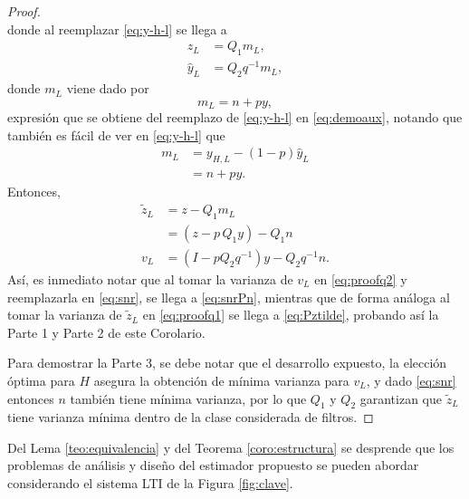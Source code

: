 \begin{proof}{\ \\}
\begin{equation}
\end{equation}
donde al reemplazar \eqref{eq:y-h-l} se llega a
\begin{align}\label{eq:en-funcion-de-m}
\hat{z}_L &= Q_1 m_L,\\
\hat{y}_L &= Q_2q^{-1} m_L,
\end{align}
donde $m_L$ viene dado por
\begin{equation}
m_L = n+py,
\end{equation}
expresi\'on que se obtiene del reemplazo de \eqref{eq:y-h-l} en \eqref{eq:demoaux}, notando que tambi\'en es f\'acil de ver en \eqref{eq:y-h-l} que
\begin{align}\label{eq:y-barra}
\nonumber 
m_L &= y_{H,L} - (1-p) \hat{y}_L \\
&= n + p y.
\end{align}
Entonces,
\begin{align}
\tilde{z}_L &=  z - Q_1 m_L\\ \label{eq:proofq1} &= ( z - p\, Q_1 y ) - Q_1 n\\
\label{eq:proofq2}
v_L &= \left( I -  pQ_2q^{-1} \right) y - Q_2q^{-1} n.
\end{align}
As\'i, es inmediato notar que al tomar la varianza de $v_L$ en \eqref{eq:proofq2} y reemplazarla en \eqref{eq:snr}, se llega a \eqref{eq:snrPn}, mientras que de forma an\'aloga al tomar la varianza de $\tilde{z}_L$ en \eqref{eq:proofq1} se llega a \eqref{eq:Pztilde}, probando as\'i la Parte 1 y Parte 2 de este Corolario.

Para demostrar la Parte 3, se debe notar que el desarrollo expuesto, la elecci\'on \'optima para $H$ asegura la obtenci\'on de m\'inima varianza para $v_L$, y dado \eqref{eq:snr} entonces $n$ tambi\'en tiene m\'inima varianza, por lo que $Q_1$ y $Q_2$ garantizan que $\tilde{z}_L$ tiene varianza m\'inima dentro de la clase considerada de filtros.
\QED
\end{proof}
\newpage
Del Lema \ref{teo:equivalencia} y del Teorema \ref{coro:estructura} se desprende que los problemas de an\'alisis y dise\~no del estimador propuesto se pueden abordar considerando el sistema LTI de la Figura \ref{fig:clave}.

